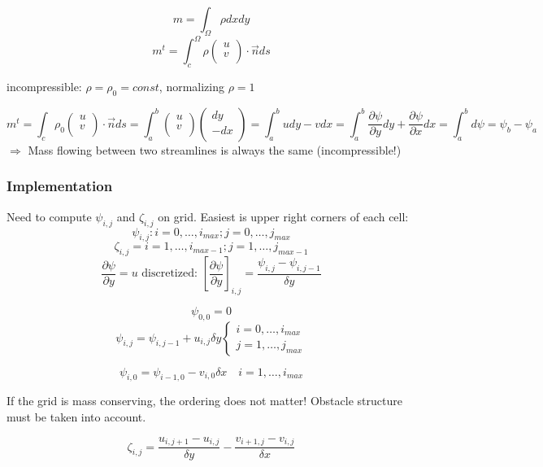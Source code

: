 \[ m = \int_\Omega \rho dxdy \]
\[ m^t = \int_c^\Omega \rho \begin{pmatrix} u \\ v \\ \end{pmatrix} \cdot \vec{n} ds \]

incompressible: $ \rho = \rho_0 = const$, normalizing $\rho = 1$

\[ m^t = \int_c \rho_0 \begin{pmatrix}u \\v \\ \end{pmatrix} \cdot \vec{n} ds = \int_a^b \begin{pmatrix}u \\ v \\ \end{pmatrix} \begin{pmatrix}dy \\ -dx \\ \end{pmatrix} = \int_a^b udy - vdx = \int_a^b \frac{\partial \psi}{\partial y} dy + \frac{\partial \psi}{\partial x} dx = \int_a^b d \psi = \psi_b - \psi_a\]
$\Rightarrow$ Mass flowing between two streamlines is always the same (incompressible!)

\subsubsection{Implementation}
Need to compute $\psi_{i,j}$ and $\zeta_{i,j}$ on grid. Easiest is upper right corners of each cell: 
\[ \psi_{i,j} : i = 0,\dots, i_{max} ; j = 0, \dots, j_{max}\]
\[ \zeta_{i,j} = i = 1,\dots,i_{max-1}; j = 1, \dots, j_{max-1}\]
\[ \frac{\partial \psi}{\partial y} = u \text{ discretized: } \left[ \frac{\partial \psi}{\partial y} \right]_{i,j} = \frac{\psi_{i,j} - \psi_{i,j-1}}{\delta y}\]

\[ \psi_{0,0} = 0 \]
\[ \psi_{i,j} = \psi_{i,j-1} + u_{i,j} \delta y \begin{cases} i = 0, \dots, i_{max} \\ j = 1, \dots, j_{max} \end{cases} \]

\[ \psi_{i,0} = \psi_{i-1,0} - v_{i,0} \delta x \quad i = 1,\dots,i_{max} \]

If the grid is mass conserving, the ordering does not matter! Obstacle structure must be taken into account.

\[ \zeta_{i,j} = \frac{u_{i,j+1} - u_{i,j}}{\delta y} - \frac{v_{i+1,j} - v_{i,j}}{\delta x} \]

